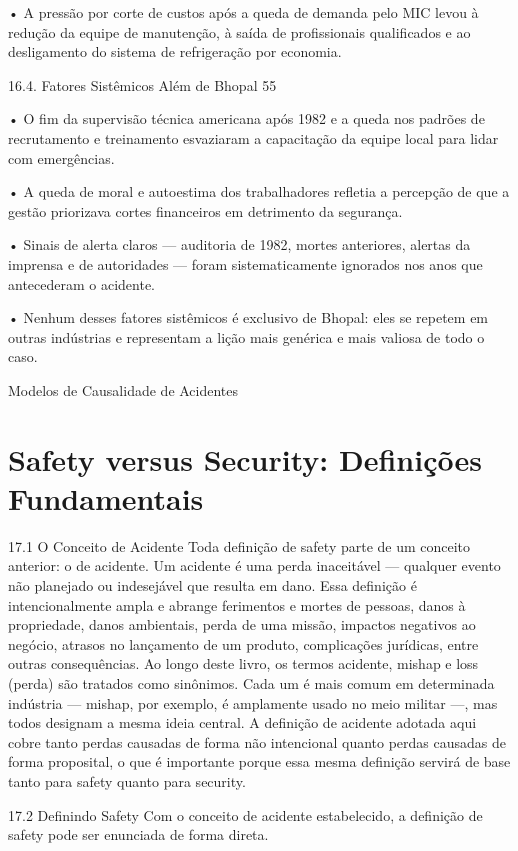 • A pressão por corte de custos após a queda de demanda pelo MIC levou à redução da equipe de manutenção, à saída de profissionais qualificados e ao desligamento do sistema de refrigeração por economia.

16.4. Fatores Sistêmicos Além de Bhopal 55

• O fim da supervisão técnica americana após 1982 e a queda nos padrões de recrutamento e treinamento esvaziaram a capacitação da equipe local para lidar com emergências.

• A queda de moral e autoestima dos trabalhadores refletia a percepção de que a gestão priorizava cortes financeiros em detrimento da segurança.

• Sinais de alerta claros — auditoria de 1982, mortes anteriores, alertas da imprensa e de autoridades — foram sistematicamente ignorados nos anos que antecederam o acidente.

• Nenhum desses fatores sistêmicos é exclusivo de Bhopal: eles se repetem em outras indústrias e representam a lição mais genérica e mais valiosa de todo o caso.

Modelos de Causalidade de Acidentes

\chapter{Safety versus Security: Definições Fundamentais}

17.1 O Conceito de Acidente Toda definição de safety parte de um conceito anterior: o de acidente. Um acidente é uma perda inaceitável — qualquer evento não planejado ou indesejável que resulta em dano. Essa definição é intencionalmente ampla e abrange ferimentos e mortes de pessoas, danos à propriedade, danos ambientais, perda de uma missão, impactos negativos ao negócio, atrasos no lançamento de um produto, complicações jurídicas, entre outras consequências. Ao longo deste livro, os termos acidente, mishap e loss (perda) são tratados como sinônimos. Cada um é mais comum em determinada indústria — mishap, por exemplo, é amplamente usado no meio militar —, mas todos designam a mesma ideia central. A definição de acidente adotada aqui cobre tanto perdas causadas de forma não intencional quanto perdas causadas de forma proposital, o que é importante porque essa mesma definição servirá de base tanto para safety quanto para security.

17.2 Definindo Safety Com o conceito de acidente estabelecido, a definição de safety pode ser enunciada de forma direta.

